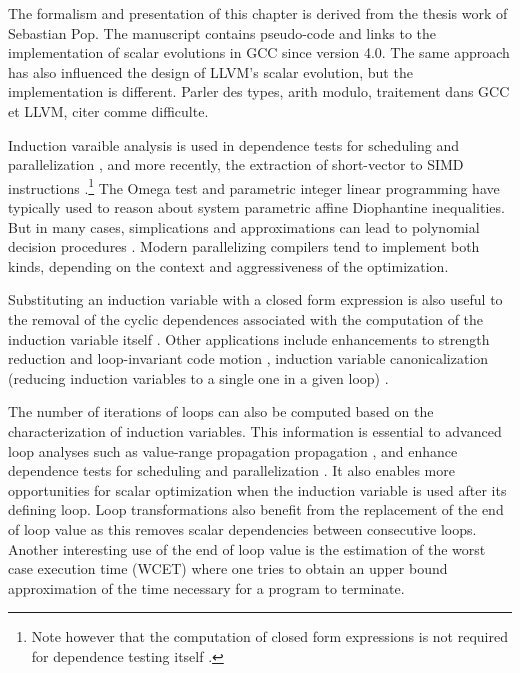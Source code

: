 {The formalism and presentation of this chapter is derived from the thesis work of Sebastian Pop. 
The manuscript \cite{TPop} contains pseudo-code and links to the implementation of scalar evolutions in GCC since version 4.0. 
The same approach has also influenced the design of LLVM's scalar evolution, but the implementation is different. 
Parler des types, arith modulo, traitement dans GCC et LLVM, citer comme difficulte.

Induction varaible analysis is used in dependence tests for scheduling and parallelization \cite{Wol96}, and more recently, the extraction of short-vector to SIMD instructions \cite{Nuz06}.\footnote{Note however that the computation of closed form expressions is not required for dependence testing itself \cite{Wu01}.} 
The Omega test \cite{Pug91} and parametric integer linear programming \cite{Fea88b} have typically used to reason about system parametric affine Diophantine inequalities. 
But in many cases, simplications and approximations can lead to polynomial decision procedures \cite{Ban88}. 
Modern parallelizing compilers tend to implement both kinds, depending on the context and aggressiveness of the optimization.

Substituting an induction variable with a closed form expression is also useful to the removal of the cyclic dependences associated with the computation of the induction variable itself \cite{Ger95}. 
Other applications include enhancements to strength reduction and loop-invariant code motion \cite{Ger95}, induction variable canonicalization (reducing induction variables to a single one in a given loop) \cite{Liu96}.

The number of iterations of loops can also be computed based on the characterization of induction variables. 
This information is essential to advanced loop analyses such as value-range propagation propagation \cite{VRP}, and enhance dependence tests for scheduling and parallelization \cite{Ban88,Pug91}. 
It also enables more opportunities for scalar optimization when the induction variable is used after its defining loop. 
Loop transformations also benefit from the replacement of the end of loop value as this removes scalar dependencies between consecutive loops. 
Another interesting use of the end of loop value is the estimation of the worst case execution time (WCET) where one tries to obtain an upper bound approximation of the time necessary for a program to terminate.


}
